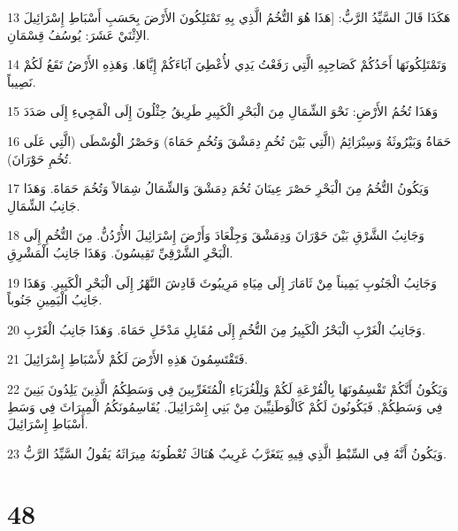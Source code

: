 \par 13 هَكَذَا قَالَ السَّيِّدُ الرَّبُّ: [هَذَا هُوَ التُّخُمُ الَّذِي بِهِ تَمْتَلِكُونَ الأَرْضَ بِحَسَبِ أَسْبَاطِ إِسْرَائِيلَ الاِثْنَيْ عَشَرَ: يُوسُفُ قِسْمَانِ.
\par 14 وَتَمْتَلِكُونَهَا أَحَدُكُمْ كَصَاحِبِهِ الَّتِي رَفَعْتُ يَدِي لأُعْطِيَ آبَاءَكُمْ إِيَّاهَا. وَهَذِهِ الأَرْضُ تَقَعُ لَكُمْ نَصِيباً.
\par 15 وَهَذَا تُخُمُ الأَرْضِ: نَحْوَ الشِّمَالِ مِنَ الْبَحْرِ الْكَبِيرِ طَرِيقُ حِثْلُونَ إِلَى الْمَجِيءِ إِلَى صَدَدَ
\par 16 حَمَاةُ وَبَيْرُوثَةُ وَسِبْرَائِمُ (الَّتِي بَيْنَ تُخُمِ دِمَشْقَ وَتُخُمِ حَمَاةَ) وَحَصْرُ الْوُسْطَى (الَّتِي عَلَى تُخُمِ حَوْرَانَ).
\par 17 وَيَكُونُ التُّخُمُ مِنَ الْبَحْرِ حَصْرَ عِينَانَ تُخُمَ دِمَشْقَ وَالشِّمَالُ شِمَالاً وَتُخُمَ حَمَاةَ. وَهَذَا جَانِبُ الشِّمَالِ.
\par 18 وَجَانِبُ الشَّرْقِ بَيْنَ حَوْرَانَ وَدِمَشْقَ وَجِلْعَادَ وَأَرْضَ إِسْرَائِيلَ الأُرْدُنُّ. مِنَ التُّخُمِ إِلَى الْبَحْرِ الشَّرْقِيِّ تَقِيسُونَ. وَهَذَا جَانِبُ الْمَشْرِقِ.
\par 19 وَجَانِبُ الْجَنُوبِ يَمِيناً مِنْ ثَامَارَ إِلَى مِيَاهِ مَرِيبُوثَ قَادِشَ النَّهْرُ إِلَى الْبَحْرِ الْكَبِيرِ. وَهَذَا جَانِبُ الْيَمِينِ جَنُوباً.
\par 20 وَجَانِبُ الْغَرْبِ الْبَحْرُ الْكَبِيرُ مِنَ التُّخُمِ إِلَى مُقَابِلِ مَدْخَلِ حَمَاةَ. وَهَذَا جَانِبُ الْغَرْبِ.
\par 21 فَتَقْتَسِمُونَ هَذِهِ الأَرْضَ لَكُمْ لأَسْبَاطِ إِسْرَائِيلَ.
\par 22 وَيَكُونُ أَنَّكُمْ تَقْسِمُونَهَا بِالْقُرْعَةِ لَكُمْ وَلِلْغُرَبَاءِ الْمُتَغَرِّبِينَ فِي وَسَطِكُمُ الَّذِينَ يَلِدُونَ بَنِينَ فِي وَسَطِكُمْ, فَيَكُونُونَ لَكُمْ كَالْوَطَنِيِّينَ مِنْ بَنِي إِسْرَائِيلَ. يُقَاسِمُونَكُمُ الْمِيرَاثَ فِي وَسَطِ أَسْبَاطِ إِسْرَائِيلَ.
\par 23 وَيَكُونُ أَنَّهُ فِي السِّبْطِ الَّذِي فِيهِ يَتَغَرَّبُ غَرِيبٌ هُنَاكَ تُعْطُونَهُ مِيرَاثَهُ يَقُولُ السَّيِّدُ الرَّبُّ.

\chapter{48}


